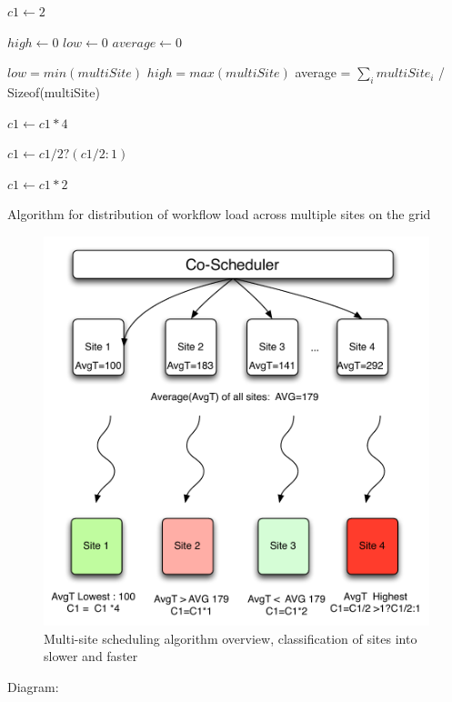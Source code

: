 \documentclass[ms,electronic,double]{nuthesis}
\begin{document}
\begin{algorithm}
\begin{algorithmic}

\STATE $c1 \gets 2$ 

\STATE $high \gets 0$
\STATE $low \gets 0$
\STATE $average \gets 0$

\STATE $low = min(multiSite)$
\STATE $high = max(multiSite)$
\STATE average = $\sum_i multiSite_i$ / Sizeof(multiSite)

\STATE $c1 \gets c1 * 4$
\ENDIF

\STATE $c1 \gets c1/2 ? (c1/2:1)$
\ENDIF

\STATE $c1 \gets c1 * 2$
\ENDIF

\end{algorithmic}
\caption{Algorithm for distribution of workflow load across multiple sites on the grid}
\label{alg:updateJobPropagationConstant()}
\end{algorithm}


\begin{figure}[htbp!]
\begin{center}
\includegraphics[scale=0.75]{images/multipleSites}
\caption{Multi-site scheduling algorithm overview, classification of sites into slower and faster}
\label{fig:multiSite1}
\end{center}
\end{figure}
\FloatBarrier
Diagram:
\end{document}
